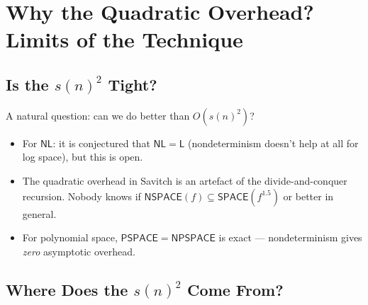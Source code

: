 \documentclass[12pt,a4paper]{article}
\theoremstyle{plain}
\theoremstyle{definition}
\theoremstyle{remark}
\newcommand{\SPACE}{\mathsf{SPACE}}
\newcommand{\NSPACE}{\mathsf{NSPACE}}
\newcommand{\PSPACE}{\mathsf{PSPACE}}
\newcommand{\NPSPACE}{\mathsf{NPSPACE}}
\newcommand{\NL}{\mathsf{NL}}
\newcommand{\LL}{\mathsf{L}}
\begin{document}
\section{Why the Quadratic Overhead? Limits of the Technique}

\subsection{Is the $s(n)^2$ Tight?}

A natural question: can we do better than $O(s(n)^2)$?

\begin{itemize}
  \item For $\NL$: it is conjectured that $\NL = \LL$ (nondeterminism doesn't help at all for log space), but this is open.
  \item The quadratic overhead in Savitch is an artefact of the divide-and-conquer recursion. Nobody knows if $\NSPACE(f) \subseteq \SPACE(f^{1.5})$ or better in general.
  \item For polynomial space, $\PSPACE = \NPSPACE$ is exact — nondeterminism gives \emph{zero} asymptotic overhead.
\end{itemize}

\subsection{Where Does the $s(n)^2$ Come From?}
\end{document}
